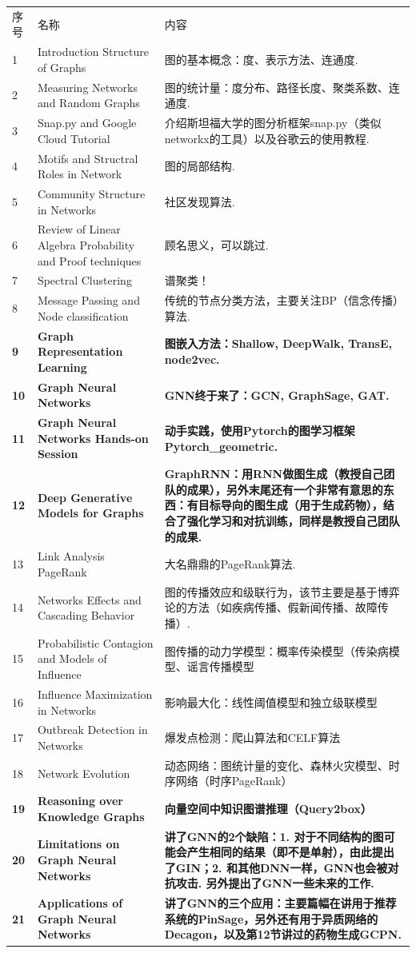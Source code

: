 \documentclass[lang=cn,11pt,a4paper]{elegant_template}
\begin{document}
\begin{longtable}{p{0.8cm}p{5.5cm}p{9cm}}
序号 & 名称 & 内容 \\
1 & Introduction Structure of Graphs & 图的基本概念：度、表示方法、连通度. \\
2 & Measuring Networks and Random Graphs & 图的统计量：度分布、路径长度、聚类系数、连通度.  \\
3 & Snap.py and Google Cloud Tutorial & 介绍斯坦福大学的图分析框架snap.py（类似networkx的工具）以及谷歌云的使用教程. \\
4 & Motifs and Structral Roles in Network & 图的局部结构.  \\
5 & Community Structure in Networks & 社区发现算法.  \\
6 & Review of Linear Algebra Probability and Proof techniques & 顾名思义，可以跳过.  \\
7 & Spectral Clustering & 谱聚类！ \\
8 & Message Passing and Node classification & 传统的节点分类方法，主要关注BP（信念传播）算法. \\
\textbf{9} & \textbf{Graph Representation Learning} & \textbf{图嵌入方法：Shallow, DeepWalk, TransE, node2vec.} \\
\textbf{10} & \textbf{Graph Neural Networks} & \textbf{GNN终于来了：GCN, GraphSage, GAT.}  \\
\textbf{11} & \textbf{Graph Neural Networks Hands-on Session} & \textbf{动手实践，使用Pytorch的图学习框架Pytorch\_geometric.} \\
\textbf{12} & \textbf{Deep Generative Models for Graphs} & \textbf{GraphRNN：用RNN做图生成（教授自己团队的成果），另外末尾还有一个非常有意思的东西：有目标导向的图生成（用于生成药物），结合了强化学习和对抗训练，同样是教授自己团队的成果.} \\
13 & Link Analysis PageRank & 大名鼎鼎的PageRank算法.  \\
14 & Networks Effects and Cascading Behavior & 图的传播效应和级联行为，该节主要是基于博弈论的方法（如疾病传播、假新闻传播、故障传播）.  \\
15 & Probabilistic Contagion and Models of Influence & 图传播的动力学模型：概率传染模型（传染病模型、谣言传播模型 \\
16 & Influence Maximization in Networks & 影响最大化：线性阈值模型和独立级联模型 \\
17 & Outbreak Detection in Networks & 爆发点检测：爬山算法和CELF算法 \\
18 & Network Evolution & 动态网络：图统计量的变化、森林火灾模型、时序网络（时序PageRank） \\
\textbf{19} & \textbf{Reasoning over Knowledge Graphs} & \textbf{向量空间中知识图谱推理（Query2box）} \\
\textbf{20} & \textbf{Limitations on Graph Neural Networks} & \textbf{讲了GNN的2个缺陷：1. 对于不同结构的图可能会产生相同的结果（即不是单射），由此提出了GIN；2. 和其他DNN一样，GNN也会被对抗攻击. 另外提出了GNN一些未来的工作.}  \\
\textbf{21} & \textbf{Applications of Graph Neural Networks} & \textbf{讲了GNN的三个应用：主要篇幅在讲用于推荐系统的PinSage，另外还有用于异质网络的Decagon，以及第12节讲过的药物生成GCPN.} 
\end{longtable}
\end{document}
